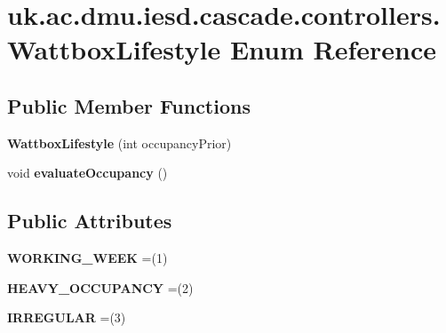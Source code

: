 \hypertarget{enumuk_1_1ac_1_1dmu_1_1iesd_1_1cascade_1_1controllers_1_1_wattbox_lifestyle}{\section{uk.\-ac.\-dmu.\-iesd.\-cascade.\-controllers.\-Wattbox\-Lifestyle Enum Reference}
\label{enumuk_1_1ac_1_1dmu_1_1iesd_1_1cascade_1_1controllers_1_1_wattbox_lifestyle}
}
\subsection*{Public Member Functions}
\begin{DoxyCompactItemize}
\item 
\hypertarget{enumuk_1_1ac_1_1dmu_1_1iesd_1_1cascade_1_1controllers_1_1_wattbox_lifestyle_a51f163ae5fc6e6adbcf9c8574ed813cc}{{\bfseries Wattbox\-Lifestyle} (int occupancy\-Prior)}\label{enumuk_1_1ac_1_1dmu_1_1iesd_1_1cascade_1_1controllers_1_1_wattbox_lifestyle_a51f163ae5fc6e6adbcf9c8574ed813cc}

\item 
\hypertarget{enumuk_1_1ac_1_1dmu_1_1iesd_1_1cascade_1_1controllers_1_1_wattbox_lifestyle_a1dcd3f1886b8bd6e244fd7dd0c4303ee}{void {\bfseries evaluate\-Occupancy} ()}\label{enumuk_1_1ac_1_1dmu_1_1iesd_1_1cascade_1_1controllers_1_1_wattbox_lifestyle_a1dcd3f1886b8bd6e244fd7dd0c4303ee}

\end{DoxyCompactItemize}
\subsection*{Public Attributes}
\begin{DoxyCompactItemize}
\item 
\hypertarget{enumuk_1_1ac_1_1dmu_1_1iesd_1_1cascade_1_1controllers_1_1_wattbox_lifestyle_a8e17799e40a174a4f3445beeabf6fa8a}{{\bfseries W\-O\-R\-K\-I\-N\-G\-\_\-\-W\-E\-E\-K} =(1)}\label{enumuk_1_1ac_1_1dmu_1_1iesd_1_1cascade_1_1controllers_1_1_wattbox_lifestyle_a8e17799e40a174a4f3445beeabf6fa8a}

\item 
\hypertarget{enumuk_1_1ac_1_1dmu_1_1iesd_1_1cascade_1_1controllers_1_1_wattbox_lifestyle_a37b99a1bbadc8aef11bdac6e4fc287e6}{{\bfseries H\-E\-A\-V\-Y\-\_\-\-O\-C\-C\-U\-P\-A\-N\-C\-Y} =(2)}\label{enumuk_1_1ac_1_1dmu_1_1iesd_1_1cascade_1_1controllers_1_1_wattbox_lifestyle_a37b99a1bbadc8aef11bdac6e4fc287e6}

\item 
\hypertarget{enumuk_1_1ac_1_1dmu_1_1iesd_1_1cascade_1_1controllers_1_1_wattbox_lifestyle_adb40647c8b75be7b0b9e792fa04fb609}{{\bfseries I\-R\-R\-E\-G\-U\-L\-A\-R} =(3)}\label{enumuk_1_1ac_1_1dmu_1_1iesd_1_1cascade_1_1controllers_1_1_wattbox_lifestyle_adb40647c8b75be7b0b9e792fa04fb609}

\end{DoxyCompactItemize}


